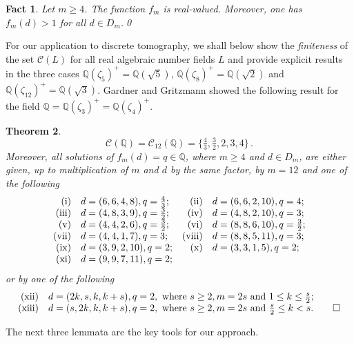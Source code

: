 \documentclass[a4paper]{amsart}
\newtheorem{theorem}{Theorem}[section]
\newtheorem{fact}[theorem]{Fact}
\theoremstyle{definition}
\numberwithin{equation}{section}
\numberwithin{theorem}{section}
\begin{document}
\begin{fact}\label{fmdg1}\cite[Lemma 3.1]{GG} 
Let $m\geq 4$. The function
$f_{m}$ is real-valued. Moreover, one has $f_{m}(d)>1$ for all $d\in
D_{m}$.\qed
\end{fact}

For our application to discrete tomography, we shall below show the
{\em finiteness} of the
set $\mathcal{C}(L)$ 
 for all real algebraic number fields $L$ and provide
 explicit results in the three cases ${\mathbb{Q}}(\zeta_{5})^+={\mathbb{Q}}(\sqrt{5})$,
 ${\mathbb{Q}}(\zeta_8)^+={\mathbb{Q}}(\sqrt{2})$ and 
 ${\mathbb{Q}}(\zeta_{12})^+={\mathbb{Q}}(\sqrt{3})$. Gardner and Gritzmann showed the
 following result for the field ${\mathbb{Q}}={\mathbb{Q}}(\zeta_3)^+={\mathbb{Q}}(\zeta_4)^+$.

\begin{theorem}\cite[Lemma 3.8, Lemma 3.9 and Thm.~ 3.10]{GG}\label{intersectq}
$$
\mathcal{C}({\mathbb{Q}})=\mathcal{C}_{12}({\mathbb{Q}})=\big\{\tfrac{4}{3},\tfrac{3}{2},2,3,4\big\}\,.
$$
Moreover, all solutions of $f_{m}(d)=q\in{\mathbb{Q}}$, where $m\geq 4$ and
$d\in D_{m}$, are either given, up to multiplication of $m$
and $d$ by the same factor, by $m=12$ and one of the following
$$
\begin{array}{rlrl}
\textnormal{(i)}&d=(6,6,4,8),q=\frac{4}{3};&\textnormal{(ii)}&d=(6,6,2,10),q=4;\\
\textnormal{(iii)}&d=(4,8,3,9),q=\frac{3}{2};&\textnormal{(iv)}&d=(4,8,2,10),q=3;\\
\textnormal{(v)}&d=(4,4,2,6),q=\frac{3}{2};&\textnormal{(vi)}&d=(8,8,6,10),q=\frac{3}{2};\\
\textnormal{(vii)}&d=(4,4,1,7),q=3;&\textnormal{(viii)}&d=(8,8,5,11),q=3;\\
\textnormal{(ix)}&d=(3,9,2,10),q=2;&\textnormal{(x)}&d=(3,3,1,5),q=2;\\
\textnormal{(xi)}&d=(9,9,7,11),q=2;&&
\end{array}
$$
or by one of the following
$$
\begin{array}{rl}
\textnormal{(xii)}&d=(2k,s,k,k+s),q=2, \mbox{ where } s\geq 2, m=2s \mbox{
  and } 1\leq k\leq \frac{s}{2};\\
\textnormal{(xiii)}&d=(s,2k,k,k+s),q=2, \mbox{ where } s\geq 2, m=2s \mbox{
  and } \frac{s}{2}\leq k< s.\qed
\end{array}
$$
\end{theorem}

The next three lemmata are the key tools for our approach.
\end{document}
